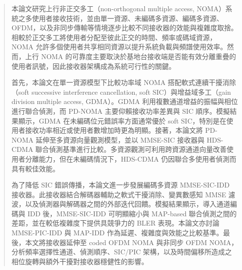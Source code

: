 
\begin{abstract}

本論文研究上行非正交多工（non-orthogonal multiple access, NOMA）系統之多使用者接收技術，並由單一資源、未編碼多資源、編碼多資源、OFDM，以及非同步傳輸等情境逐步比較不同接收器的效能與複雜度取捨。相較於正交多工將使用者分配至彼此正交的時間、頻率或碼域資源，NOMA 允許多個使用者共享相同資源以提升系統負載與頻譜使用效率。然而，上行 NOMA 的可靠度主要取決於基地台接收端是否能有效分離重疊的使用者訊號，因此接收器架構成為系統可行性的關鍵。

首先，本論文在單一資源模型下比較功率域 NOMA 搭配軟式連續干擾消除（soft successive interference cancellation, soft SIC）與增益域多工（gain division multiple access, GDMA）。GDMA 利用複數通道增益的振幅與相位進行聯合偵測，而 PD-NOMA 主要仰賴接收功率差異與 SIC 順序。模擬結果顯示，GDMA 在未編碼位元錯誤率方面通常優於 soft SIC，特別是在使用者接收功率相近或使用者數增加時更為明顯。接著，本論文將 PD-NOMA 延伸至多資源向量觀測模型，並以 MMSE-SIC 接收器與 HDS-CDMA 聯合偵測基準進行比較。多資源觀測可利用跨資源通道向量改善使用者分離能力，但在未編碼情況下，HDS-CDMA 仍因聯合多使用者偵測而具有較佳效能。

為了降低 SIC 錯誤傳播，本論文進一步發展編碼多資源 MMSE-SIC-IDD 接收器。此接收器結合解碼器輔助之軟式干擾消除、變異數感知 MMSE 濾波，以及偵測器與解碼器之間的外部迭代回饋。模擬結果顯示，導入通道編碼與 IDD 後，MMSE-SIC-IDD 可明顯縮小與 MAP-based 聯合偵測之間的差距，並在較低複雜度下提供具競爭力的 BLER 表現。本論文亦討論 MMSE-PIC-IDD 與 MAP-IDD 作為延遲、複雜度與效能之比較基準。最後，本文將接收器延伸至 coded OFDM NOMA 與非同步 OFDM NOMA，分析頻率選擇性通道、偵測順序、SIC/PIC 架構，以及時間偏移所造成之相位旋轉與額外干擾對接收器穩健性的影響。

\end{abstract}

